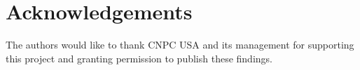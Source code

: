 \chapter*{Acknowledgements}

The authors would like to thank CNPC USA and its management for supporting this project and granting permission to publish these findings.